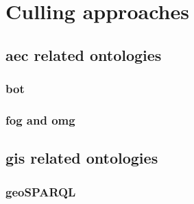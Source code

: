 \chapter{Culling approaches}
    \section{\acs{aec} related ontologies}
        \subsection{\acs{bot}}
        \subsection{\acs{fog} and \acs{omg}}

    \section{\acs{gis} related ontologies}
        \subsection{geoSPARQL} 
